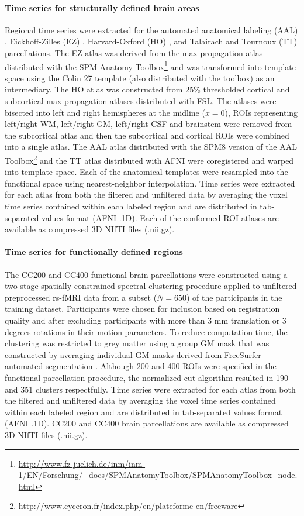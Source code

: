 \documentclass[preprint,12pt,3p]{elsarticle}
\begin{document}
\paragraph{Time series for structurally defined brain areas} Regional time series were extracted for the automated anatomical labeling (AAL) \cite{tzourio2002automated}, Eickhoff-Zilles (EZ) \cite{eickhoff2005new}, Harvard-Oxford (HO) \cite{HO_atlas_1, HO_atlas_2, HO_atlas_3, HO_atlas_4}, and Talairach and Tournoux (TT) \cite{lancaster2000automated} parcellations. The EZ atlas was derived from the max-propagation atlas distributed with the SPM Anatomy Toolbox\footnote{\url{http://www.fz-juelich.de/inm/inm-1/EN/Forschung/_docs/SPMAnatomyToolbox/SPMAnatomyToolbox_node.html}} and was transformed into template space using the Colin 27 template (also distributed with the toolbox) as an intermediary. The HO atlas was constructed from 25\% thresholded cortical and subcortical max-propagation atlases distributed with FSL. The atlases were bisected into left and right hemispheres at the midline ($x=0$), ROIs representing left/right WM, left/right GM, left/right CSF and brainstem were removed from the subcortical atlas and then the subcortical and cortical ROIs were combined into a single atlas. The AAL atlas distributed with the SPM8 version of the AAL Toolbox\footnote{\url{http://www.cyceron.fr/index.php/en/plateforme-en/freeware}} and the TT atlas distributed with AFNI were coregistered and warped into template space. Each of the anatomical templates were resampled into the functional space using nearest-neighbor interpolation. Time series were extracted for each atlas from both the filtered and unfiltered data by averaging the voxel time series contained within each labeled region and are distributed in tab-separated values format (AFNI .1D). Each of the conformed ROI atlases are available as compressed 3D NIfTI files (.nii.gz).

\paragraph{Time series for functionally defined regions} The CC200 and CC400 functional brain parcellations were constructed using a two-stage spatially-constrained spectral clustering procedure \cite{craddock2012whole} applied to unfiltered preprocessed rs-fMRI data from a subset ($N=650$) of the participants in the training dataset. Participants were chosen for inclusion based on registration quality and after excluding participants with more than 3 mm translation or 3 degrees rotations in their motion parameters. To reduce computation time, the clustering was restricted to grey matter using a group GM mask that was constructed by averaging individual GM masks derived from FreeSurfer automated segmentation \cite{dale1999freesurfer}. Although 200 and 400 ROIs were specified in the functional parcellation procedure, the normalized cut algorithm resulted in 190 and 351 clusters respectfully. Time series were extracted for each atlas from both the filtered and unfiltered data by averaging the voxel time series contained within each labeled region and are distributed in tab-separated values format (AFNI .1D). CC200 and CC400 brain parcellations are available as compressed 3D NIfTI files (.nii.gz).
\end{document}
